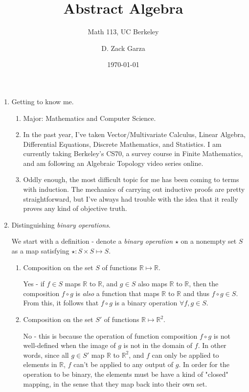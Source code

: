 \documentclass{scrartcl}
\author{D. Zack Garza}
\title{Abstract Algebra}
\subtitle{Math 113, UC Berkeley}
\date{\today}
\begin{document}
\maketitle

\begin{enumerate}

	\item Getting to know me.
	
	\begin{enumerate}
	
		\item Major: Mathematics and Computer Science.
		
		\item In the past year, I've taken Vector/Multivariate Calculus, Linear Algebra, Differential Equations, Discrete Mathematics, and Statistics. I am currently taking Berkeley's CS70, a survey course in Finite Mathematics, and am following an Algebraic Topology video series online.
		
		\item Oddly enough, the most difficult topic for me has been coming to terms with induction. The mechanics of carrying out inductive proofs are pretty straightforward, but I've always had trouble with the idea that it really proves any kind of objective truth.
		
	\end{enumerate}
	
	\item Distinguishing \textit{binary operations}.
	
		We start with a definition - denote a \textit{binary operation} $\star$ on a nonempty set $S$  as a map satisfying $\star : S \times S \mapsto S$.
	
		\begin{enumerate}
		
			\item Composition on the set $S$ of functions $\mathbb{R}\mapsto\mathbb{R}$.
			
				Yes - if $f \in S$ maps $\mathbb{R}$ to $\mathbb{R}$, and $g \in S$ also maps $\mathbb{R}$ to $\mathbb{R}$, then the composition $f \circ g$ is \textit{also} a function that maps $\mathbb{R}$ to $\mathbb{R}$ and thus $f \circ g \in S$. From this, it follows that $f \circ g$ is a binary operation $\forall f,g \in S$.
			
			\item Composition on the set $S'$ of functions $\mathbb{R}\mapsto\mathbb{R}^2$.
			
				No - this is because the operation of function composition $f \circ g$ is not well-defined when the image of $g$ is not in the domain of $f$. In other words, since all $g \in S'$ map $\mathbb{R}$ to $\mathbb{R}^2$, and $f$ can only be applied to elements in $\mathbb{R}$, $f$ can't be applied to any output of $g$. In order for the operation to be binary, the elements must be have a kind of "closed" mapping, in the sense that they map back into their own set.
			

\end{enumerate}
\end{enumerate}
\end{document}
